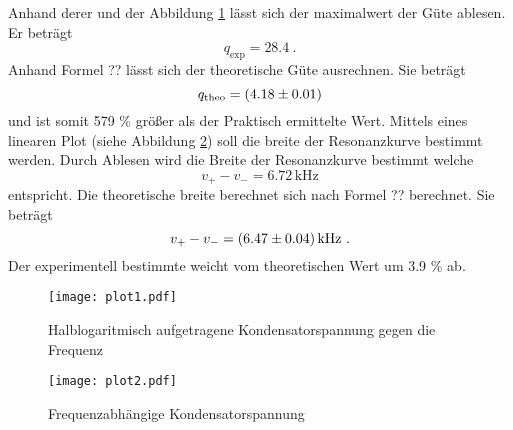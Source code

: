 Anhand derer und der Abbildung \ref{fig:logUc} lässt sich der maximalwert der Güte ablesen. Er beträgt
\begin{equation}
  q_\text{exp} = 28.4 \ .
  \label{eqn:qexp}
\end{equation}
Anhand Formel ?? lässt sich der theoretische Güte ausrechnen. Sie beträgt 
\begin{equation}
  q_\text{theo} = (\num{4.18 +- 0.01})
  \label{eqn:qtheo}
\end{equation} 
und ist somit 579 \% größer als der Praktisch ermittelte Wert. Mittels eines linearen Plot (siehe Abbildung \ref{fig:fUc}) soll die breite der Resonanzkurve bestimmt werden. Durch Ablesen wird die Breite der Resonanzkurve bestimmt welche 
\begin{equation}
  v_+ - v_- = 6.72 \, \text{kHz} 
\end{equation}
entspricht. Die theoretische breite berechnet sich nach Formel ?? berechnet. Sie beträgt 
\begin{equation}
v_+ - v_- = (\num{6.47 +- 0.04}) \, \text{kHz} \ .
\end{equation}
Der experimentell bestimmte weicht vom theoretischen Wert um 3.9 \% ab.
\begin{figure}
  \centering
  \texttt{[image: plot1.pdf]}
  \caption{Halblogaritmisch aufgetragene Kondensatorspannung gegen die Frequenz}
  \label{fig:logUc}
\end{figure}

\begin{figure}
  \centering
  \texttt{[image: plot2.pdf]}
  \caption{Frequenzabhängige Kondensatorspannung}
  \label{fig:fUc}
\end{figure}

